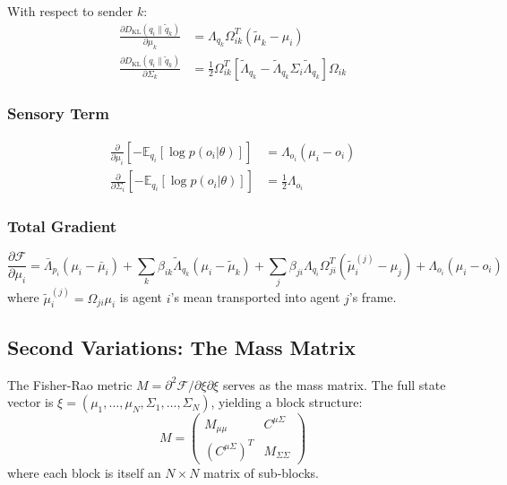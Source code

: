 \documentclass[11pt]{article}
\begin{document}
With respect to sender $k$:
\begin{align}
\frac{\partial D_{\mathrm{KL}}(q_i \| \tilde{q}_k)}{\partial \mu_k} &= \Lambda_{q_k}\Omega_{ik}^T(\tilde{\mu}_k - \mu_i) \\
\frac{\partial D_{\mathrm{KL}}(q_i \| \tilde{q}_k)}{\partial \Sigma_k} &= \frac{1}{2}\Omega_{ik}^T\left[\tilde{\Lambda}_{q_k} - \tilde{\Lambda}_{q_k}\Sigma_i\tilde{\Lambda}_{q_k}\right]\Omega_{ik}
\end{align}

\subsubsection{Sensory Term}
\begin{align}
\frac{\partial}{\partial \mu_i}\left[-\mathbb{E}_{q_i}[\log p(o_i | \theta)]\right] &= \Lambda_{o_i}(\mu_i - o_i) \\
\frac{\partial}{\partial \Sigma_i}\left[-\mathbb{E}_{q_i}[\log p(o_i | \theta)]\right] &= \frac{1}{2}\Lambda_{o_i}
\end{align}

\subsubsection{Total Gradient}
\begin{equation}
\frac{\partial \mathcal{F}}{\partial \mu_i} = \bar{\Lambda}_{p_i}(\mu_i - \bar{\mu}_i) + \sum_k \beta_{ik}\tilde{\Lambda}_{q_k}(\mu_i - \tilde{\mu}_k) + \sum_j \beta_{ji}\Lambda_{q_i}\Omega_{ji}^T(\tilde{\mu}_i^{(j)} - \mu_j) + \Lambda_{o_i}(\mu_i - o_i)
\label{eq:total_gradient_mu}
\end{equation}
where $\tilde{\mu}_i^{(j)} = \Omega_{ji}\mu_i$ is agent $i$'s mean transported into agent $j$'s frame.

\subsection{Second Variations: The Mass Matrix}

The Fisher-Rao metric $M = \partial^2 \mathcal{F}/\partial\xi\partial\xi$ serves as the mass matrix. The full state vector is $\xi = (\mu_1, \ldots, \mu_N, \Sigma_1, \ldots, \Sigma_N)$, yielding a block structure:
\begin{equation}
M = \begin{pmatrix} M_{\mu\mu} & C^{\mu\Sigma} \\ (C^{\mu\Sigma})^T & M_{\Sigma\Sigma} \end{pmatrix}
\label{eq:mass_block_structure}
\end{equation}
where each block is itself an $N \times N$ matrix of sub-blocks.
\end{document}
